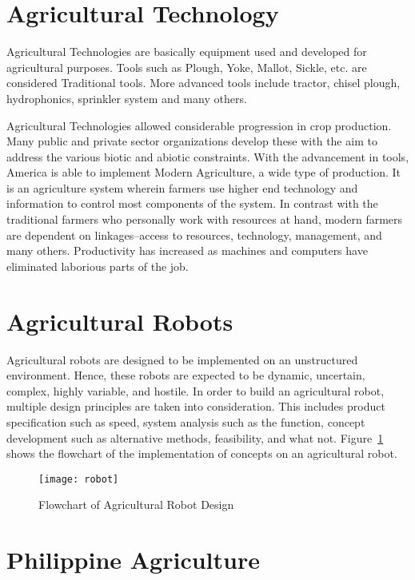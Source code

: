 \section{Agricultural Technology}

Agricultural Technologies are basically equipment used and developed for agricultural purposes. Tools such as Plough, Yoke, Mallot, Sickle, etc. are considered Traditional tools. More advanced tools include tractor, chisel plough, hydrophonics, sprinkler system and many others.

	Agricultural Technologies allowed considerable progression in crop production. Many public and private sector organizations develop these with the aim to address the various biotic and abiotic constraints. With the advancement in tools, America is able to implement Modern Agriculture, a wide type of production. It is an agriculture system wherein farmers use higher end technology and information to control most components of the system. In contrast with the traditional farmers who personally work with resources at hand, modern farmers are dependent on linkages--access to resources, technology, management, and many others. Productivity has increased as machines and computers have eliminated laborious parts of the job. ~\cite{Motes}
	
\section{Agricultural Robots}

	Agricultural robots are designed to be implemented on an unstructured environment. Hence, these robots are expected to be dynamic, uncertain, complex, highly variable, and hostile. In order to build an agricultural robot, multiple design principles are taken into consideration. This includes product specification such as speed, system analysis such as the function, concept development such as alternative methods, feasibility, and what not. Figure~\ref{fig:robot} shows the flowchart  of the implementation of concepts on an agricultural robot.~\cite{Edan}

\begin{figure}[!htbp]
	\centering
		\texttt{[image: robot]}
	\caption{Flowchart of Agricultural Robot Design}
	\label{fig:robot}
\end{figure}

\section{Philippine Agriculture}

